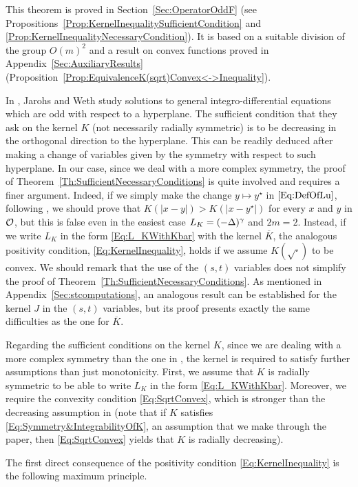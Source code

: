 This theorem is proved in Section~\ref{Sec:OperatorOddF} (see Propositions~\ref{Prop:KernelInequalitySufficientCondition} and \ref{Prop:KernelInequalityNecessaryCondition}). It is based on a suitable division of the group $O(m)^2$ and a result on convex functions proved in Appendix~\ref{Sec:AuxiliaryResults} (Proposition~\ref{Prop:EquivalenceK(sqrt)Convex<->Inequality}).

In \cite{JarohsWeth}, Jarohs and Weth study solutions to general integro-differential equations which are odd with respect to a hyperplane. The sufficient condition that they ask on the kernel $K$ (not necessarily radially symmetric) is to be decreasing in the orthogonal direction to the hyperplane. This can be readily deduced after making a change of variables given by the symmetry with respect to such hyperplane. In our case, since we deal with a more complex symmetry, the proof of Theorem~\ref{Th:SufficientNecessaryConditions} is quite involved and requires a finer argument. Indeed, if we simply make the change $y \mapsto y^\star$ in $\eqref{Eq:DefOfLu}$, following \cite{JarohsWeth}, we should prove that $K(|x-y|) > K(|x-y^\star|)$ for every $x$ and $y$ in $\mathcal{O}$, but this is false even in the easiest case $L_K = (-\Delta)^\gamma$ and $2m=2$. Instead, if we write $L_K$ in the form \eqref{Eq:L_KWithKbar} with the kernel $\overline{K}$, the analogous positivity condition, \eqref{Eq:KernelInequality}, holds if we assume $K(\sqrt{\cdot})$ to be convex. We should remark that the use of the $(s,t)$ variables does not simplify the proof of Theorem~\ref{Th:SufficientNecessaryConditions}. As mentioned in Appendix~\ref{Sec:stcomputations}, an analogous result can be established for the kernel $J$ in the $(s,t)$ variables, but its proof presents exactly the same difficulties as the one for $\overline{K}$.

Regarding the sufficient conditions on the kernel $K$, since we are dealing with a more complex symmetry than the one in \cite{JarohsWeth}, the kernel is required to satisfy further assumptions than just monotonicity. First, we assume that $K$ is radially symmetric to be able to write $L_K$ in the form \eqref{Eq:L_KWithKbar}. Moreover, we require the convexity condition \eqref{Eq:SqrtConvex}, which is stronger than the decreasing assumption in \cite{JarohsWeth} (note that if $K$ satisfies \eqref{Eq:Symmetry&IntegrabilityOfK}, an assumption that we make through the paper, then \eqref{Eq:SqrtConvex} yields that $K$ is radially decreasing). 

The first direct consequence of the positivity condition \eqref{Eq:KernelInequality} is the following maximum principle.

